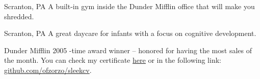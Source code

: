 \documentclass{sleekcv}%
\begin{document}
\begin{bodycol}
	\begin{bodysection}[PROJECTS]%
		{Scranton, PA}
		{}
		{}
		{}
		\bodytext
		A built-in gym inside the Dunder Mifflin office that will make you shredded.

		\newpage{}
		{Scranton, PA}
		{}
		{}
		{}
		\bodytext
		A great daycare for infants with a focus on cognitive development.
	\end{bodysection}

	\begin{bodysection}[AWARDS]%
		{Dunder Mifflin}
		{2005}
		{}
		{}
		-time award winner – honored for having the most sales of the month. You can check my certificate \underline{\href{https://github.com/ofzorzo/sleekcv}{here}} or in the following link: \href{https://github.com/ofzorzo/sleekcv}{github.com/ofzorzo/sleekcv}.
	\end{bodysection}

\end{bodycol}
\end{document}
